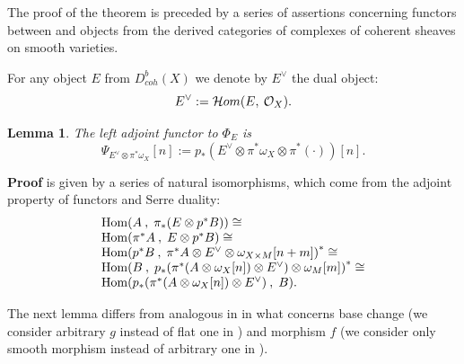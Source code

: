 \documentclass[12pt]{article}
\newtheorem{lemma}[theorem]{Lemma}
\def\db#1{ D^b_{coh}({#1})}
\def\h#1,#2{{\rm Hom}({#1}\:,\; {#2})}
\def\o#1{{\cal O}_{#1}}
\begin{document}
The proof of the theorem is preceded by a series of assertions concerning functors between and objects from the derived categories of complexes of coherent sheaves on smooth varieties.

For any object $E$ from $\db{X}$ we denote by $E^{\vee}$ the dual object:
$$
E^{\vee}:={\cal H}om( E,\:{\o X}).
$$


\begin{lemma}\label{adj}
The left adjoint functor to $\Phi_{E}$ is
$$
\Psi_{E^{\vee}\otimes \pi^*\omega_X}[n]:= 
  p_{*}(E^{\vee}\otimes \pi^*\omega_X\otimes \pi^*(\cdot))[n]. 
$$
\end{lemma}
{\bf Proof} is given by a series of natural isomorphisms, which come from the adjoint property of functors and Serre duality:
$$
\begin{array}{l}
 {\h A, {\pi_*(E\otimes p^*B)}}\cong \\ 
{\h {\pi^*A}, {E\otimes p^* B}}\cong  \\
{\h {p^* B}, {\pi^* A\otimes E^{\vee}\otimes \omega_{X\times M}[n+m]}}^* \cong \\
{\h B, {p_*(\pi^*(A\otimes \omega_X[n])\otimes E^{\vee})\otimes \omega_M[m]}}^* \cong\\
 {\h {p_*(\pi^*(A\otimes \omega_X[n])\otimes E^{\vee})}, B}.
\end{array}
$$
\bigskip

The next lemma differs from analogous in \cite{H} in what concerns base change (we consider arbitrary $g$ instead of flat one in \cite{H}) and morphism $f$ (we consider only smooth morphism instead of arbitrary one in \cite{H}).

\end{document}
